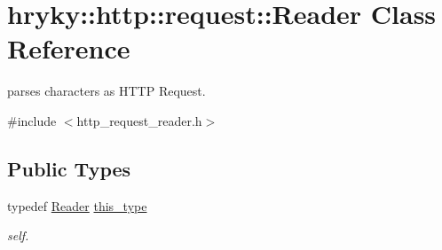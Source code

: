 \hypertarget{classhryky_1_1http_1_1request_1_1_reader}{\section{hryky\-:\-:http\-:\-:request\-:\-:Reader Class Reference}
\label{classhryky_1_1http_1_1request_1_1_reader}
}


parses characters as H\-T\-T\-P Request.  




{\ttfamily \#include $<$http\-\_\-request\-\_\-reader.\-h$>$}

\subsection*{Public Types}
\begin{DoxyCompactItemize}
\item 
\hypertarget{classhryky_1_1http_1_1request_1_1_reader_a44528b6e5afc2cadb7f22b54f2ded317}{typedef \hyperlink{classhryky_1_1http_1_1request_1_1_reader}{Reader} \hyperlink{classhryky_1_1http_1_1request_1_1_reader_a44528b6e5afc2cadb7f22b54f2ded317}{this\-\_\-type}}\label{classhryky_1_1http_1_1request_1_1_reader_a44528b6e5afc2cadb7f22b54f2ded317}

\begin{DoxyCompactList}\small\item\em self. \end{DoxyCompactList}\end{DoxyCompactItemize}
